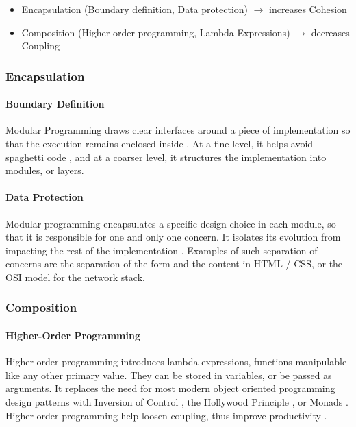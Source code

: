 \begin{itemize}
\item Encapsulation (Boundary definition, Data protection)
  \subitem $\to$ increases Cohesion
\item Composition (Higher-order programming, Lambda Expressions) %
  \subitem $\to$ decreases Coupling
\end{itemize}

\subsubsection{Encapsulation} \label{chapter3:definitions:productivity:encapsulation}

\paragraph{Boundary Definition}
%
Modular Programming draws clear interfaces around a piece of implementation so that the execution remains enclosed inside \cite{Dijkstra1970}.
At a fine level, it helps avoid spaghetti code \cite{Dijkstra1968a}, and at a coarser level, it structures the implementation \cite{Dijkstra1968} into modules, or layers.

\paragraph{Data Protection}
%
Modular programming encapsulates a specific design choice in each module, so that it is responsible for one and only one concern.
It isolates its evolution from impacting the rest of the implementation \cite{Parnas1972, Tarr1999, Hursch1995}.
Examples of such separation of concerns are the separation of the form and the content in HTML / CSS, or the OSI model for the network stack.

\subsubsection{Composition} \label{chapter3:definitions:productivity:composition}

\paragraph{Higher-Order Programming}
Higher-order programming introduces lambda expressions, functions manipulable like any other primary value.
They can be stored in variables, or be passed as arguments.
It replaces the need for most modern object oriented programming design patterns  with Inversion of Control \cite{Johnson}, the Hollywood Principle \cite{Sweet1985}, or Monads \cite{Wadler1992}.
Higher-order programming help loosen coupling, thus improve productivity \cite{Haynes1984}.

